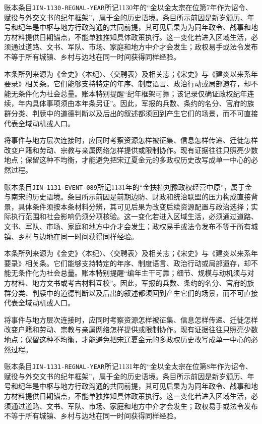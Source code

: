 账本条目\texttt{JIN-1130-REGNAL-YEAR}所记1130年的“金以金太宗在位第7年作为诏令、赋役与外交文书的纪年框架”，属于金的历史语境。条目所示前因是新岁颁历、年号和纪年是中枢与地方行政沟通的共同前提，其可见后果为为同年政令、战事和地方材料提供日期锚点，不能单独推知具体政策执行。这一变化若进入区域生活，必须通过道路、文书、军队、市场、家庭和地方中介才会发生；政权易手或法令发布不等于所有城镇、乡村与边地在同一时间获得同样经验。

本条所列来源为《金史》〈本纪〉、〈交聘表〉及相关志；《宋史》与《建炎以来系年要录》相关条。它们能够支持特定的年序、制度语言、政治行动或局部遗存，却不能无条件化为社会总量。账本特别提醒“纪年框架可靠；该记录仅确证政权纪年连续，年内具体事项须由本年条另证”。因此，军报的兵数、条约的名分、官府的族群分类、判牍中的道德判断以及后出的叙述都须回到产生它们的场景，而不可直接代表全域动机或人口。

将事件与地方层次连接时，应同时考察资源怎样被征集、信息怎样传递、迁徙怎样改变户籍和劳动、宗教与亲属网络怎样提供或限制协作。现有证据往往只照亮少数地点；保留这种不均衡，才能避免把宋辽夏金元的多政权历史改写成单一中心的必然过程。

账本条目\texttt{JIN-1131-EVENT-089}所记1131年的“金扶植刘豫政权经营中原”，属于金与南宋的历史语境。条目所示前因是前期边防、财政和统治联盟的压力构成直接背景，具体条件须按本条材料分辨，其可见后果为改变后续资源配置与政治选择；实际执行范围和社会影响仍须分项核验。这一变化若进入区域生活，必须通过道路、文书、军队、市场、家庭和地方中介才会发生；政权易手或法令发布不等于所有城镇、乡村与边地在同一时间获得同样经验。

本条所列来源为《金史》〈本纪〉、〈交聘表〉及相关志；《宋史》与《建炎以来系年要录》相关条。它们能够支持特定的年序、制度语言、政治行动或局部遗存，却不能无条件化为社会总量。账本特别提醒“编年主干可靠；细节、规模与动机须与对方材料、地方文书或考古材料互校”。因此，军报的兵数、条约的名分、官府的族群分类、判牍中的道德判断以及后出的叙述都须回到产生它们的场景，而不可直接代表全域动机或人口。

将事件与地方层次连接时，应同时考察资源怎样被征集、信息怎样传递、迁徙怎样改变户籍和劳动、宗教与亲属网络怎样提供或限制协作。现有证据往往只照亮少数地点；保留这种不均衡，才能避免把宋辽夏金元的多政权历史改写成单一中心的必然过程。

账本条目\texttt{JIN-1131-REGNAL-YEAR}所记1131年的“金以金太宗在位第8年作为诏令、赋役与外交文书的纪年框架”，属于金的历史语境。条目所示前因是新岁颁历、年号和纪年是中枢与地方行政沟通的共同前提，其可见后果为为同年政令、战事和地方材料提供日期锚点，不能单独推知具体政策执行。这一变化若进入区域生活，必须通过道路、文书、军队、市场、家庭和地方中介才会发生；政权易手或法令发布不等于所有城镇、乡村与边地在同一时间获得同样经验。

